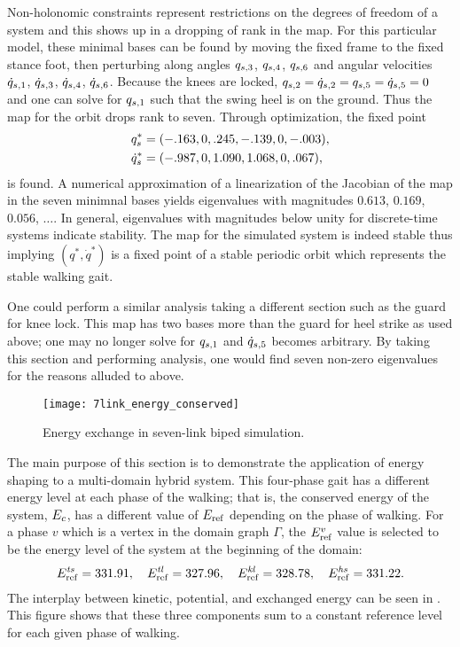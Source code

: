 Non-holonomic constraints represent restrictions on the degrees of freedom of a
system and this shows up in a dropping of rank in the \Poincare{} map.
%
For this particular model, these minimal bases can be found by moving the fixed
frame to the fixed stance foot, then perturbing along angles $q_{s,3}$,
$q_{s,4}$, $q_{s,6}$ and angular velocities $\dot{q}_{s,1}$, $\dot{q}_{s,3}$, $\dot{q}_{s,4}$,
$\dot{q}_{s,6}$.
%
Because the knees are locked, $q_{s,2} = \dot{q}_{s,2} = q_{s,5} = \dot{q}_{s,5} = 0$ and
one can solve for $q_{s,1}$ such that the swing heel is on the ground.
%
Thus the \Poincare{} map for the orbit drops rank to seven.
%
Through optimization, the fixed point
\begin{align*}
  q_{s}^{*} &= (-.163, 0, .245, -.139, 0, -.003),\\
  \dot{q}_{s}^{*} &= (-.987, 0, 1.090, 1.068, 0, .067),
\end{align*}
is found.
%
A numerical approximation of a linearization of the Jacobian of the \Poincare{}
map in the seven minimnal bases yields eigenvalues with magnitudes $0.613$,
$0.169$, $0.056$, $\ldots$.
%
In general, eigenvalues with magnitudes below unity for discrete-time systems
indicate stability.
%
The \Poincare{} map for the simulated system is indeed stable thus implying
$(q^*, \dot q^*)$ is a fixed point of a stable periodic orbit which represents
the stable walking gait.

One could perform a similar analysis taking a different \Poincare{} section such
as the guard for knee lock.
%
This map has two bases more than the guard for heel strike as used above;
%
one may no longer solve for $q_{s,1}$ and $\dot{q}_{s,5}$ becomes arbitrary.
%
By taking this \Poincare{} section and performing analysis, one would find seven
non-zero eigenvalues for the reasons alluded to above.

\begin{figure}[t!]
  \centering
  \texttt{[image: 7link\_energy\_conserved]}
  \caption[Energy exchange in seven-link biped simulation.]{Energy exchange in
    seven-link biped simulation.}
  \label{fig:7link_energy_conserved}
\end{figure}

The main purpose of this section is to demonstrate the application of energy
shaping to a multi-domain hybrid system.
%
This four-phase gait has a different energy level at each phase of the
walking; that is, the conserved energy of the system, $E_{c}$, has a different
value of $E_{\mathrm{ref}}$ depending on the phase of walking.
%
For a phase $v$ which is a vertex in the domain graph $\Gamma$, the $E_{\mathrm{ref}}^v$
value is selected to be the energy level of the system at the beginning of the
domain:
%
\begin{align*}
  E_{\mathrm{ref}}^{\mathit{ts}} = 331.91, \quad
  E_{\mathrm{ref}}^{\mathit{tl}} = 327.96, \quad
  E_{\mathrm{ref}}^{\mathit{kl}} = 328.78, \quad
  E_{\mathrm{ref}}^{\mathit{hs}} = 331.22.
\end{align*}
%
The interplay between kinetic, potential, and exchanged energy can be seen in
.
%
This figure shows that these three components sum to a constant reference level
for each given phase of walking.


